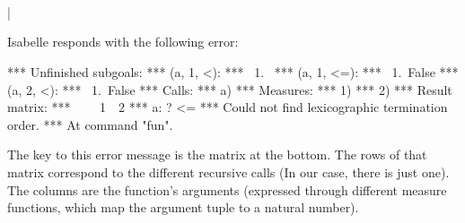 \begin{isabellebody}
\begin{isamarkuptext}
\end{isamarkuptext}  
 \\%
\\%
\hspace*{2ex}\\%
|\hspace*{1.5ex}\\
\begin{isamarkuptext}

\noindent Isabelle responds with the following error:

\begin{isabelle}
*** Unfinished subgoals:\newline
*** (a, 1, <):\newline
*** \ 1.~\newline
*** (a, 1, <=):\newline
*** \ 1.~False\newline
*** (a, 2, <):\newline
*** \ 1.~False\newline
*** Calls:\newline
*** a) \newline
*** Measures:\newline
*** 1) \newline
*** 2) \newline
*** Result matrix:\newline
*** \ \ \ \ 1\ \ 2  \newline
*** a:  ?   <= \newline
*** Could not find lexicographic termination order.\newline
*** At command "fun".\newline
\end{isabelle}%
\end{isamarkuptext}%
\isamarkuptrue%
%
\begin{isamarkuptext}%
The key to this error message is the matrix at the bottom. The rows
  of that matrix correspond to the different recursive calls (In our
  case, there is just one). The columns are the function's arguments 
  (expressed through different measure functions, which map the
  argument tuple to a natural number). 


\end{isamarkuptext}
\end{isabellebody}
